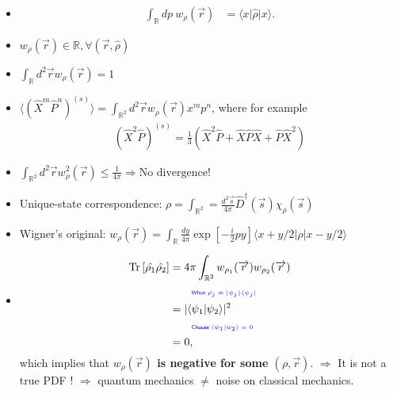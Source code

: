 \documentclass[../../note.tex]{subfiles}
\begin{document}
\begin{property}
    \begin{itemize}
        \item     
        \begin{align}
            \int_{\mathbb{R}}d p~w_{\rho}(\overrightarrow{r}) 
            &= \langle x \vert \hat{\rho} \vert x \rangle.
        \end{align}
        \item $w_{\rho}(\overrightarrow{r}) \in \mathbb{R}, \forall (\overrightarrow{r}, \hat{\rho})$
        \item $\int_{\mathbb{R}} d^2 \overrightarrow{r} w_{\rho}(\overrightarrow{r}) = 1$ 
        \item $\langle (\hat{X}^m \hat{P}^n)^{(s)} \rangle = \int_{\mathbb{R}^2} d^2 \overrightarrow{r} w_{\rho}(\overrightarrow{r}) x^m p^n$, where for example 
        \begin{align}
            (\hat{X}^2 \hat{P})^{(s)} = \frac{1}{3}\left(\hat{X}^2 \hat{P} + \hat{X} \hat{P} \hat{X} + \hat{P} \hat{X}^2 \right)
        \end{align}
        \item $\int_{\mathbb{R}^2} d^2 \overrightarrow{r} w_{\rho}^2(\overrightarrow{r}) \leq \frac{1}{4 \pi} \Longrightarrow \textrm{No divergence!}$ 
        \item Unique-state correspondence: $\rho = \int_{\mathbb{R}^2} = \frac{d^2 \overrightarrow{s}}{4 \pi} \hat{D}^\dagger(\overrightarrow{s}) \chi_{\rho}(\overrightarrow{s})$ 
        \item Wigner's original: $w_{\rho}(\overrightarrow{r}) = \int_{\mathbb{R}} \frac{d y}{4 \pi} \exp\left[- \frac{i}{2} p y\right] \langle x+y/2 \vert \hat{\rho} \vert x - y/2 \rangle$
        \item
        \begin{align}
            \operatorname{Tr}\left[\hat{\rho_1} \hat{\rho_2}\right] 
            &= 4 \pi \int_{\mathbb{R}^2} w_{\rho_1}(\overrightarrow{r}) w_{\rho_2}(\overrightarrow{r}) \\
            &\qquad\text{\color{blue}{\tiny\sffamily When $\hat{\rho_j} = \vert \psi_j \rangle \langle \psi_j \vert$}} \nonumber \\
            &= \vert \langle \psi_1 \vert \psi_2 \rangle \vert^2 \\
            &\qquad\text{\color{blue}{\tiny\sffamily Choose $\langle \psi_1 \vert \psi_2 \rangle = 0$}} \nonumber \\
            &= 0,
        \end{align}
        which implies that \textbf{$w_{\rho}(\overrightarrow{r})$ is negative for some $(\rho, \overrightarrow{r})$}. $\Longrightarrow$ It is not a true PDF ! $\Longrightarrow$  quantum mechanics $\neq$ noise on classical mechanics.
    \end{itemize}
\end{property}
\end{document}
